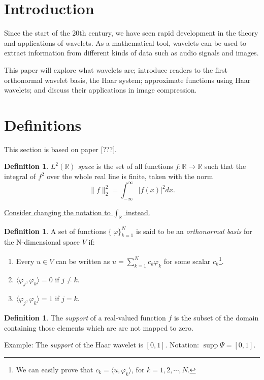 \documentclass[2pt]{amsart}
\author{Jason Ngo}
\theoremstyle{theorem} %
\theoremstyle{definition}
\newtheorem{defn}[thm]{Definition}
\theoremstyle{example}
\theoremstyle{remark}
\numberwithin{equation}{section}
\newcommand{\R}{\mathbb{R}}
\DeclareMathOperator*{\supp}{supp}
\begin{document}
	
\section{Introduction}
Since the start of the 20th century, we have seen rapid development in the theory and applications of wavelets. As a mathematical tool, wavelets can be used to extract information from different kinds of data such as audio signals and images.

This paper will explore what wavelets are; introduce readers to the first orthonormal wavelet basis, the Haar system; approximate functions using Haar wavelets; and discuss their applications in image compression.

\section{Definitions}
This section is based on paper [???].

\begin{defn} \label{def:l2}
	\emph{$ L^2(\R) $ space} is the set of all functions $ f: \R \to \R $ such that the integral of $ f^2 $ over the whole real line is finite, taken with the norm
	\[ \|f\|_2^2 = \int_{-\infty}^{\infty} |f(x)|^2 dx. \]
\end{defn}

\underline{Consider changing the notation to $ \int_\R $ instead.}

\begin{defn} \label{def:orthonormal}
	A set of functions $ \{\ \varphi \}_{k=1}^N $ is said to be an \emph{orthonormal basis} for the N-dimensional space $ V $ if:
	\begin{enumerate}
		\item Every $ u \in V $ can be written as $ u = \sum_{k=1}^N c_k \varphi_k $ for some scalar $ c_k $\footnote{We can easily prove that $ c_k = \langle u,\varphi_k \rangle $, for $ k = 1,2,\cdots,N. $}.
		\item $ \langle \varphi_j, \varphi_k \rangle = 0 $ if $ j \neq k $.
		\item $ \langle \varphi_j, \varphi_k \rangle = 1 $ if $ j = k $.
	\end{enumerate}
\end{defn}

\begin{defn} \label{def:support}
	The \emph{support} of a real-valued function $ f $ is the subset of the domain containing those elements which are are not mapped to zero.
	
	Example: The \emph{support} of the Haar wavelet is $ [0,1] $.
	Notation: $ \supp \varPsi = [0,1] $.
\end{defn}
\end{document}
